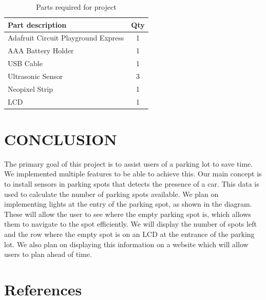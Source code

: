 \documentclass[12pt]{article}
\begin{document}
\begin{table}[!h]
  \caption{Parts required for project}
  \label{table:parts_list}
  \begin{center}
  \begin{tabular}{|p{3in}|c|}
  
  \hline
  Part description & Qty\\
  \hline
  \hline
  Adafruit Circuit Playground Express & 1 \\
  \hline
  AAA Battery Holder & 1 \\
  \hline
  USB Cable & 1 \\
  \hline
  Ultrasonic Sensor & 3 \\
  \hline
  Neopixel Strip & 1 \\
  \hline
  LCD & 1 \\
  \hline
  \end{tabular}
  \end{center}
\end{table}
\section{CONCLUSION}
The primary goal of this project is to assist users of a parking lot to save time. We implemented multiple features to be able to achieve this. Our main concept is to install sensors in parking spots that detects the presence of a car. This data is used to calculate the number of parking spots available. We plan on implementing lights at the entry of the parking spot, as shown in the diagram. These will allow the user to see where the empty parking spot is, which allows them to navigate to the spot efficiently. We will display the number of spots left and the row where the empty spot is on an LCD at the entrance of the parking lot. We also plan on displaying this information on a website which will allow users to plan ahead of time.

\newpage
\section{References}
\printbibliography[heading=subbibintoc]
%
%
\end{document}

